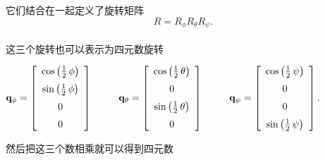 它们结合在一起定义了旋转矩阵 \\

$$ R = R_{\phi} R_{\theta} R_{\psi}. $$\\ 

这三个旋转也可以表示为四元数旋转 \\

\begin{center}
$ \mathbf{q_{\phi}} =  \left[ \begin {array}{c} \cos \left( \frac{1}{2}\,{\it \phi} \right) \\\noalign{\medskip}\sin \left( \frac{1}{2}\,{\it \phi} \right) \\\noalign{\medskip}0\\\noalign{\medskip}0\end {array} \right] $ $\qquad$ $ \mathbf{q_{\theta}} =  \left[ \begin {array}{c} \cos \left( \frac{1}{2}\,{\it \theta} \right) \\\noalign{\medskip}0\\\noalign{\medskip}\sin \left( \frac{1}{2}\,{\it \theta} \right) \\\noalign{\medskip}0\end {array} \right] $ $\qquad$ $ \mathbf{q_{\psi}} =  \left[ \begin {array}{c} \cos \left( \frac{1}{2}\,{\it \psi} \right) \\\noalign{\medskip}0\\\noalign{\medskip}0\\\noalign{\medskip}\sin \left( \frac{1}{2}\,{\it \psi} \right) \end {array} \right] .$\\
\end{center}

\vspace{0.8cm}
然后把这三个数相乘就可以得到四元数 \\

